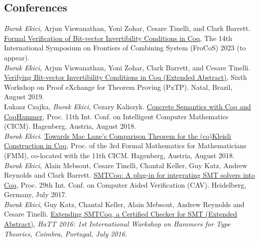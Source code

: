 \documentclass[10pt, a4paper]{article}
\newcommand{\years}[1]{\marginnote{\scriptsize #1}}
\begin{document}
\subsection*{Conferences}
\years{\normalsize2023}
\emph{Burak Ekici}, Arjun Viswanathan, Yoni Zohar, Cesare
Tinelli, and Clark Barrett.
{\href{}{Formal Verification of Bit-vector Invertibility Conditions in Coq}}, 
The 14th International Symposium on Frontiers of Combining System (FroCoS) 2023 (to appear).
 \\[0.20cm]
\years{\normalsize2019}
\emph{Burak Ekici}, Arjun Viswanathan, Yoni Zohar, Clark Barrett, and Cesare
Tinelli.
{\href{http://pxtp.gforge.inria.fr/2019/papers/PxTP_2019_paper_5.pdf}{Verifying Bit-vector Invertibility Conditions in Coq (Extended Abstract)}}, 
Sixth Workshop on Proof eXchange for Theorem Proving (PxTP). Natal, Brazil, August 2019.
 \\[0.20cm]
\years{\normalsize2018}
\L ukasz Czajka, \emph{Burak Ekici}, Cezary Kaliszyk.
{\href{https://www.mimuw.edu.pl/~lukaszcz/cicm2018.pdf}{Concrete Semantics with Coq and CoqHammer}}, 
Proc. 11th Int. Conf. on Intelligent Computer Mathematics (CICM). Hagenberg, Austria, August 2018.
 \\[0.20cm]
\years{\normalsize2018}
\emph{Burak Ekici}.
{\href{https://www.cicm-conference.org/2018/infproc/paper11.pdf}{Towards Mac Lane's Comparison Theorem for the (co)Kleisli Construction in Coq}},
Proc. of the 3rd Formal Mathematics for Mathematicians (FMM), co-located with the 11th CICM. Hagenberg, Austria, August 2018.
 \\[0.20cm]
\years{\normalsize2017}
\emph{Burak Ekici}, Alain Mebsout, Cesare Tinelli,
Chantal Keller, Guy Katz, Andrew Reynolds and Clark Barrett. 
{\href{http://homepage.divms.uiowa.edu/~tinelli/papers/EkiEtAl-CAV-17.pdf}{SMTCoq: A plug-in for integrating SMT solvers into Coq}}, 
Proc. 29th Int. Conf. on Computer Aided Verification (CAV). Heidelberg, Germany, July 2017.
 \\[0.20cm]
\years{\normalsize2016}
\emph{Burak Ekici}, Guy Katz, Chantal Keller, Alain Mebsout, Andrew Reynolds and Cesare Tinelli.
{\href{http://eptcs.web.cse.unsw.edu.au/paper.cgi?HaTT2016.5}{Extending SMTCoq, a Certified Checker for SMT (Extended Abstract)}}, 
\emph{HaTT 2016: 1st International Workshop on Hammers for Type Theories, Coimbra, Portugal, July 2016.}
\end{document}
